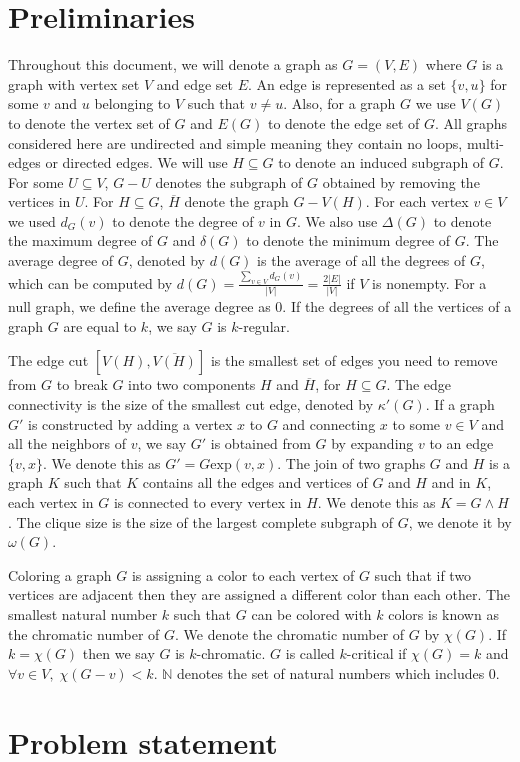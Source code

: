 \documentclass{article}
\begin{document}
\section{Preliminaries}
Throughout this document, we will denote a graph as $G = (V, E)$ where $G$ is a graph with vertex set $V$ and edge set $E$. An edge is represented as a set $\{v,u\}$ for some $v$ and $u$ belonging to $V$ such that $v \neq u$. Also, for a graph $G$ we use $V(G)$ to denote the vertex set of $G$ and $E(G)$ to denote the edge set of $G$. All graphs considered here are undirected and simple meaning they contain no loops, multi-edges or directed edges. We will use $H \subseteq G$ to denote an induced subgraph of $G$. For some $U \subseteq V$, $G-U$ denotes the subgraph of $G$ obtained by removing the vertices in $U$. For $H \subseteq G$, \;$\overline{H}$ denote the graph $G-V(H)$. For each vertex $v\in V$ we used $d_G(v)$ to denote the degree of $v$ in $G$. We also use $\Delta(G)$ to denote the maximum degree of $G$ and $\delta(G)$ to denote the minimum degree of $G$. The average degree of $G$, denoted by $d(G)$ is the average of all the degrees of $G$, which can be computed by $d(G) = \frac{\sum_{v\in V}d_G(v)}{|V|}= \frac{2|E|}{|V|}$ if $V$ is nonempty. For a null graph, we define the average degree as 0. If the degrees of all the vertices of a graph $G$ are equal to $k$, we say $G$ is $k$-regular.
 
The edge cut $[V(H),\overline{V(H)}]$ is the smallest set of edges you need to remove from $G$ to break $G$ into two components $H$ and $\overline{H}$, for $H \subseteq G$. The edge connectivity is the size of the smallest cut edge, denoted by $\kappa'(G)$. If a graph $G'$ is constructed by adding a vertex $x$ to $G$ and connecting $x$ to some $v \in V$ and all the neighbors of $v$, we say $G'$ is obtained from $G$ by expanding $v$ to an edge $\{v,x\}$. We denote this as $G' = G\text{exp}(v,x)$. The join of two graphs $G$ and $H$ is a graph $K$ such that $K$ contains all the edges and vertices of $G$ and $H$ and in $K$, each vertex in $G$ is connected to every vertex in $H$. We denote this as $K = G \land H$. The clique size is the size of the largest complete subgraph of $G$, we denote it by $\omega(G)$. 

Coloring a graph $G$ is assigning a color to each vertex of $G$ such that if two vertices are adjacent then they are assigned a different color than each other. The smallest natural number $k$ such that $G$ can be colored with $k$ colors is known as the chromatic number of $G$. We denote the chromatic number of $G$ by $\chi(G)$.
If $k = \chi(G)$ then we say $G$ is $k$-chromatic. $G$ is called $k$-critical if $\chi(G) = k$ and $\forall v \in V,\; \chi(G-v) < k$. $\mathbb{N}$ denotes the set of natural numbers which includes $0$.


\section{Problem statement}


 

\end{document}
